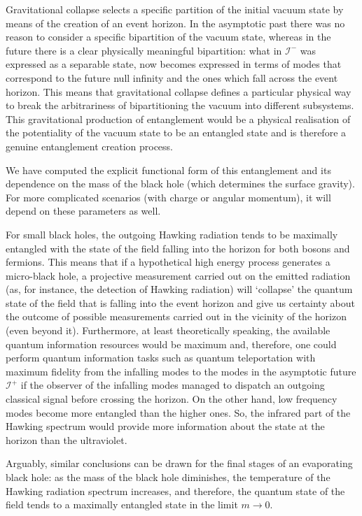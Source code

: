 Gravitational collapse selects a specific partition  of the initial vacuum
state by means of the creation of an event horizon. In the asymptotic
past there was no reason to consider a specific bipartition of the vacuum
state, whereas in the future there is a clear physically meaningful
bipartition: what in $\mathscr{I}^-$ was expressed as a separable state,
now becomes expressed in terms of modes that correspond to the future
null infinity and the ones which fall across the event horizon. This means
that gravitational collapse defines a particular physical way to break the
arbitrariness of bipartitioning the vacuum into different  subsystems.
This gravitational production of entanglement would be a physical
realisation  of the potentiality of the vacuum state to be an entangled
state and is therefore a genuine entanglement creation process.

We have computed the explicit functional form of this entanglement and
its dependence on the mass of the black hole (which determines the
surface gravity). For more complicated scenarios (with charge or angular
momentum), it will depend on these parameters as well.




For small black holes, the outgoing Hawking radiation tends to be
maximally entangled with the state of the field falling into the horizon
for both bosons and fermions. This means that if a hypothetical high
energy process generates a micro-black hole, a projective measurement
carried out on the emitted radiation (as, for instance, the detection of
Hawking radiation) will `collapse' the quantum state of the field that is
falling into the event horizon and give us certainty about the outcome of
possible measurements carried out in the vicinity of the horizon (even beyond it).
Furthermore, at least theoretically speaking, the available quantum
information resources would be maximum and, therefore, one could
perform quantum information tasks such as  quantum teleportation with
maximum fidelity from the infalling modes to the modes in the asymptotic
future $\mathscr{I}^+$ if the observer of the infalling modes managed
to dispatch an outgoing classical signal  before crossing the horizon. On
the other hand, low frequency modes become more entangled than the
higher ones. So, the infrared part of the Hawking spectrum would provide
more information about the state at the horizon than the ultraviolet.


Arguably, similar conclusions can be drawn for the final stages of an
evaporating black hole: as the mass of the black hole diminishes, the
temperature of the Hawking radiation spectrum increases, and
therefore, the quantum state of the field tends to a maximally entangled state
 in the limit $m\rightarrow0$.


